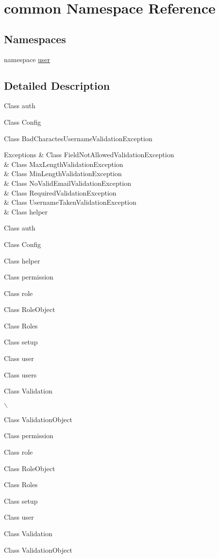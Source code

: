 \hypertarget{namespacecommon}{\section{common \-Namespace \-Reference}
\label{namespacecommon}
}
\subsection*{\-Namespaces}
\begin{DoxyCompactItemize}
\item 
namespace \hyperlink{namespacecommon_1_1user}{user}
\end{DoxyCompactItemize}


\subsection{\-Detailed \-Description}
\-Class auth

\-Class \-Config

\-Class \-Bad\-Charactes\-Username\-Validation\-Exception


\begin{DoxyExceptions}{\-Exceptions}
{\em } & \-Class \-Field\-Not\-Allowed\-Validation\-Exception\\
\hline
{\em } & \-Class \-Max\-Length\-Validation\-Exception\\
\hline
{\em } & \-Class \-Min\-Length\-Validation\-Exception\\
\hline
{\em } & \-Class \-No\-Valid\-Email\-Validation\-Exception\\
\hline
{\em } & \-Class \-Required\-Validation\-Exception\\
\hline
{\em } & \-Class \-Username\-Taken\-Validation\-Exception\\
\hline
{\em } & \-Class helper\\
\hline
\end{DoxyExceptions}


\-Class auth

\-Class \-Config

\-Class helper

\-Class permission

\-Class role

\-Class \-Role\-Object

\-Class \-Roles

\-Class setup

\-Class user

\-Class users

\-Class \-Validation

$\backslash$

\-Class \-Validation\-Object

\-Class permission

\-Class role

\-Class \-Role\-Object

\-Class \-Roles

\-Class setup

\-Class user

\-Class \-Validation

\-Class \-Validation\-Object